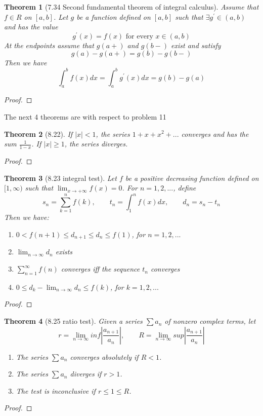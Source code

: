 \documentclass[aps,pra,notitlepage,amsmath,amssymb,letterpaper,12pt]{revtex4-1}
\newtheorem{theorem}{Theorem}
\begin{document}
\begin{theorem}[7.34 Second fundamental theorem of integral calculus]
Assume that $f \in R$ on $[a,b]$. Let $g$ be a function defined on $[a,b]$ such that $\exists g^\prime \in (a,b)$ and has the value
\[g^\prime(x) = f(x) \textrm{ for every } x \in (a,b)\]
At the endpoints assume that $g(a+)$ and $g(b-)$ exist and satisfy
\[g(a) - g(a+) = g(b) - g(b-)\]
Then we have
\[\int_{a}^{b} f(x)dx = \int_{a}^{b} g^\prime(x)dx = g(b) - g(a)\]
\end{theorem}
\begin{proof}
\end{proof}

The next 4 theorems are with respect to problem 11
\begin{theorem}[8.22]
If $|x| < 1$, the series $1 + x + x^2 + ... $  converges and has the sum $\frac{1}{1-x}$. If $|x| \geq 1$, the series diverges.
\end{theorem}
\begin{proof}
\end{proof}

\begin{theorem}[8.23 integral test]
Let $f$ be a positive decreasing function defined on $[1, \infty)$ such that $\lim_{x \to +\infty}f(x) = 0$. For $n = 1,2,...$, define
\[s_{n} = \sum_{k=1}^{n}f(k), \qquad  t_{n} = \int_{1}^{n}f(x)dx,  \qquad  d_{n}=s_{n}-t_{n}\]
Then we have:
\begin{enumerate}[\upshape a)]
  \item $0 < f(n+1) \leq d_{n+1} \leq d_{n} \leq f(1)$, \qquad for  $n=1,2,...$
  \item $\lim_{n \to \infty}d_{n}$ exists
  \item $\sum_{n=1}^{\infty}f(n)$ converges iff the sequence ${t_{n}}$ converges
  \item $0 \leq d_{k}-\lim_{n \to \infty}d_{n} \leq f(k)$, \qquad for $k=1,2,...$
\end{enumerate}
\end{theorem}
\begin{proof}
\end{proof}

\begin{theorem}[8.25 ratio test]
Given a series $\sum a_{n}$ of nonzero complex terms, let
\[r = \lim_{n \to \infty} inf \left| \frac{a_{n+1}}{a_{n}}\right|, \qquad R = \lim_{n \to \infty} sup \left| \frac{a_{n+1}}{a_{n}}\right|\]
\begin{enumerate}[\upshape a)]
  \item The series $\sum a_{n}$ converges absolutely if $R < 1$.
  \item The series $\sum a_{n}$ diverges if $r>1$.
  \item The test is inconclusive if $r \leq 1 \leq R$.
\end{enumerate}
\end{theorem}
\begin{proof}
\end{proof}
\end{document}
